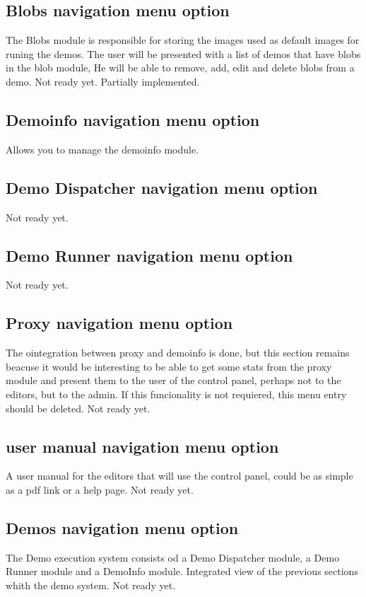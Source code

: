 \subsection{Blobs navigation menu option}
The Blobs module is responsible for storing the images used as default images for runing the demos.
The user will be presented with a list of demos that have blobs in the blob module,
He will be able to remove, add, edit and delete blobs from a demo.
Not ready yet. Partially implemented.

\subsection{Demoinfo navigation menu option}
Allows you to manage the demoinfo module.


\subsection{Demo Dispatcher navigation menu option}
Not ready yet.

\subsection{Demo Runner navigation menu option}
Not ready yet.

\subsection{Proxy navigation menu option}
The ointegration between proxy and demoinfo is done, but this section remains beacuse it would be interesting to be able to get some stats from the proxy module and present them to the user of the control panel, perhaps not to the editors, but to the admin.
If this funcionality is not requiered, this menu entry should be deleted.
Not ready yet.

\subsection{user manual navigation menu option}
A user manual for the editors that will use the control panel, could be as simple as a pdf link or a help page.
Not ready yet.

\subsection{Demos navigation menu option}
The Demo execution system consists od a Demo Dispatcher module, a Demo Runner module and a DemoInfo module.
Integrated view of the previous sections whith the demo system.
Not ready yet.



